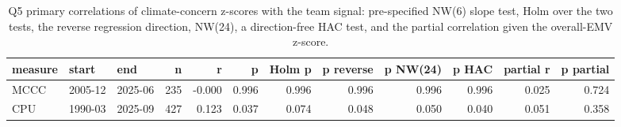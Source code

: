 \begin{table}
\caption{Q5 primary correlations of climate-concern z-scores with the team signal: pre-specified NW(6) slope test, Holm over the two tests, the reverse regression direction, NW(24), a direction-free HAC test, and the partial correlation given the overall-EMV z-score.}
\label{tab:m1_q5}
\begin{tabular}{lllrrrrrrrrr}
\toprule
measure & start & end & n & r & p & Holm p & p reverse & p NW(24) & p HAC & partial r & p partial \\
\midrule
MCCC & 2005-12 & 2025-06 & 235 & -0.000 & 0.996 & 0.996 & 0.996 & 0.996 & 0.996 & 0.025 & 0.724 \\
CPU & 1990-03 & 2025-09 & 427 & 0.123 & 0.037 & 0.074 & 0.048 & 0.050 & 0.040 & 0.051 & 0.358 \\
\bottomrule
\end{tabular}
\end{table}
